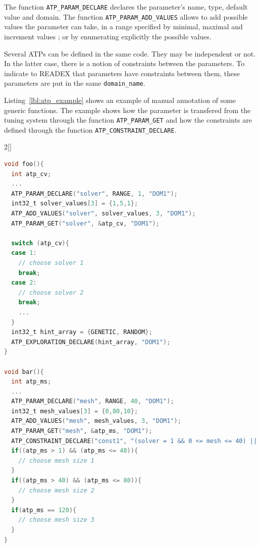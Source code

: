 The function \texttt{ATP\_PARAM\_DECLARE} declares the parameter's name, type, default value and domain. The function \texttt{ATP\_PARAM\_ADD\_VALUES} allows to add possible values the parameter can take, in a range specified by minimal, maximal and increment values ; or by enumerating explicitly the possible values.

Several ATPs can be defined in the same code. They may be independent or not. In the latter case, there is a notion of constraints between the parameters. To indicate to READEX that parameters have constraints between them, these parameters are put in the same \texttt{domain\_name}.

Listing~\ref{lbl:atp_example} shows an example of manual annotation of some generic functions. The example shows how the parameter is transfered from the tuning system through the function \texttt{ATP\_PARAM\_GET} and how the constraints are 
defined through the function \texttt{ATP\_CONSTRAINT\_DECLARE}.
\begin{multicols}{2}[] \label{lbl:atp_example}
\begin{lstlisting}[language=C,xleftmargin=3em,frame=none,title=\phantom{xxx}]
void foo(){
  int atp_cv;
  ...
  ATP_PARAM_DECLARE("solver", RANGE, 1, "DOM1");
  int32_t solver_values[3] = {1,5,1};
  ATP_ADD_VALUES("solver", solver_values, 3, "DOM1");
  ATP_PARAM_GET("solver", &atp_cv, "DOM1");
	
  switch (atp_cv){
  case 1:
    // choose solver 1
    break;
  case 2:
    // choose solver 2
    break;
    ...
  }
  int32_t hint_array = {GENETIC, RANDOM};
  ATP_EXPLORATION_DECLARE(hint_array, "DOM1");
}
	
void bar(){
  int atp_ms;
  ...
  ATP_PARAM_DECLARE("mesh", RANGE, 40, "DOM1");
  int32_t mesh_values[3] = {0,80,10};
  ATP_ADD_VALUES("mesh", mesh_values, 3, "DOM1");
  ATP_PARAM_GET("mesh", &atp_ms, "DOM1");
  ATP_CONSTRAINT_DECLARE("const1", "(solver = 1 && 0 <= mesh <= 40) || (solver = 2 && 40 <= mesh <= 80) || (solver > 2 && mesh = 120)", "DOM1");
  if((atp_ms > 1) && (atp_ms <= 40)){
    // choose mesh size 1
  }
  if((atp_ms > 40) && (atp_ms <= 80)){
    // choose mesh size 2
  }
  if(atp_ms == 120){
    // choose mesh size 3
  }
}
\end{lstlisting}
\end{multicols}

